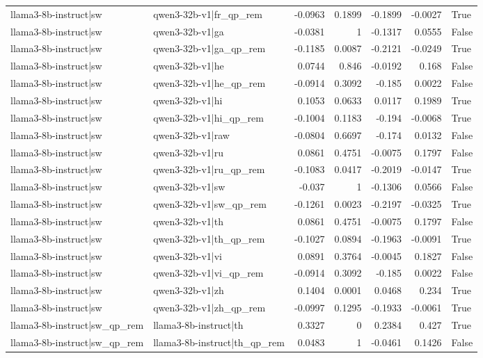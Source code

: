\begin{table}
\begin{tabular}{l l r r r r l}
llama3-8b-instruct|sw & qwen3-32b-v1|fr_qp_rem & -0.0963 & 0.1899 & -0.1899 & -0.0027 & True \\
llama3-8b-instruct|sw & qwen3-32b-v1|ga & -0.0381 & 1 & -0.1317 & 0.0555 & False \\
llama3-8b-instruct|sw & qwen3-32b-v1|ga_qp_rem & -0.1185 & 0.0087 & -0.2121 & -0.0249 & True \\
llama3-8b-instruct|sw & qwen3-32b-v1|he & 0.0744 & 0.846 & -0.0192 & 0.168 & False \\
llama3-8b-instruct|sw & qwen3-32b-v1|he_qp_rem & -0.0914 & 0.3092 & -0.185 & 0.0022 & False \\
llama3-8b-instruct|sw & qwen3-32b-v1|hi & 0.1053 & 0.0633 & 0.0117 & 0.1989 & True \\
llama3-8b-instruct|sw & qwen3-32b-v1|hi_qp_rem & -0.1004 & 0.1183 & -0.194 & -0.0068 & True \\
llama3-8b-instruct|sw & qwen3-32b-v1|raw & -0.0804 & 0.6697 & -0.174 & 0.0132 & False \\
llama3-8b-instruct|sw & qwen3-32b-v1|ru & 0.0861 & 0.4751 & -0.0075 & 0.1797 & False \\
llama3-8b-instruct|sw & qwen3-32b-v1|ru_qp_rem & -0.1083 & 0.0417 & -0.2019 & -0.0147 & True \\
llama3-8b-instruct|sw & qwen3-32b-v1|sw & -0.037 & 1 & -0.1306 & 0.0566 & False \\
llama3-8b-instruct|sw & qwen3-32b-v1|sw_qp_rem & -0.1261 & 0.0023 & -0.2197 & -0.0325 & True \\
llama3-8b-instruct|sw & qwen3-32b-v1|th & 0.0861 & 0.4751 & -0.0075 & 0.1797 & False \\
llama3-8b-instruct|sw & qwen3-32b-v1|th_qp_rem & -0.1027 & 0.0894 & -0.1963 & -0.0091 & True \\
llama3-8b-instruct|sw & qwen3-32b-v1|vi & 0.0891 & 0.3764 & -0.0045 & 0.1827 & False \\
llama3-8b-instruct|sw & qwen3-32b-v1|vi_qp_rem & -0.0914 & 0.3092 & -0.185 & 0.0022 & False \\
llama3-8b-instruct|sw & qwen3-32b-v1|zh & 0.1404 & 0.0001 & 0.0468 & 0.234 & True \\
llama3-8b-instruct|sw & qwen3-32b-v1|zh_qp_rem & -0.0997 & 0.1295 & -0.1933 & -0.0061 & True \\
llama3-8b-instruct|sw_qp_rem & llama3-8b-instruct|th & 0.3327 & 0 & 0.2384 & 0.427 & True \\
llama3-8b-instruct|sw_qp_rem & llama3-8b-instruct|th_qp_rem & 0.0483 & 1 & -0.0461 & 0.1426 & False \\

\end{tabular}
\end{table}
